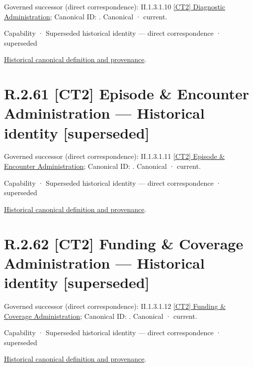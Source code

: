 {\small Governed successor (direct correspondence): II.1.3.1.10 \hyperref[element:3cc720ba2e8b4d7a94bb349391d61895]{[CT2] Diagnostic Administration}; Canonical ID: \texttt{}. Canonical · current.}\par
\label{element:2b1a27d5d9944e05b4cf0fcaad4ca433}
{\small Capability · Superseded historical identity — direct correspondence · superseded}\par
\href{../../../../continuum/strategy/capability/2b1a27d5d9944e05b4cf0fcaad4ca433.md}{Historical canonical definition and provenance}.\par
\section*{R.2.61 [CT2] Episode \& Encounter Administration — Historical identity [superseded]}
\label{navigation:R.2.61}

{\small Governed successor (direct correspondence): II.1.3.1.11 \hyperref[element:61d7067aee0540259b3daca4287d66d2]{[CT2] Episode \& Encounter Administration}; Canonical ID: \texttt{}. Canonical · current.}\par
\label{element:2778f988e8d44e3091749542c39d38a4}
{\small Capability · Superseded historical identity — direct correspondence · superseded}\par
\href{../../../../continuum/strategy/capability/2778f988e8d44e3091749542c39d38a4.md}{Historical canonical definition and provenance}.\par
\section*{R.2.62 [CT2] Funding \& Coverage Administration — Historical identity [superseded]}
\label{navigation:R.2.62}

{\small Governed successor (direct correspondence): II.1.3.1.12 \hyperref[element:640432d413cf47928ea2b3d221f92313]{[CT2] Funding \& Coverage Administration}; Canonical ID: \texttt{}. Canonical · current.}\par
\label{element:58beafcbcd084331be710eb00d27f6cf}
{\small Capability · Superseded historical identity — direct correspondence · superseded}\par
\href{../../../../continuum/strategy/capability/58beafcbcd084331be710eb00d27f6cf.md}{Historical canonical definition and provenance}.\par
